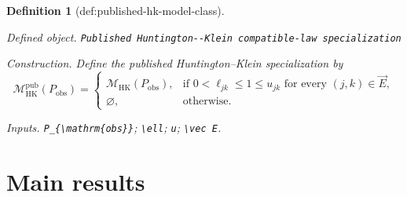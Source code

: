 \documentclass{article}
\newtheorem{definition}{Definition}
\begin{document}
\begin{definition}[def:published-hk-model-class]\label{def:published-hk-model-class}
\par\smallskip\noindent\emph{Defined object.} \texttt{Published Huntington-\allowbreak{}-\allowbreak{}Klein compatible-\allowbreak{}law specialization}
\par\smallskip\noindent\emph{Construction.} Define the published Huntington--Klein specialization by
\[
\mathcal M_{\mathrm{HK}}^{\mathrm{pub}}(P_{\mathrm{obs}})
=
\begin{cases}
\mathcal M_{\mathrm{HK}}(P_{\mathrm{obs}}),
&\text{if }0<\ell_{jk}\le 1\le u_{jk}\text{ for every }(j,k)\in\vec E,\\
\varnothing,&\text{otherwise}.
\end{cases}
\]
\par\smallskip\noindent\emph{Inputs.} \texttt{P\_\allowbreak{}\{\textbackslash{}\allowbreak{}mathrm\{obs\}\allowbreak{}\}\allowbreak{}}; \texttt{\textbackslash{}\allowbreak{}ell}; \texttt{u}; \texttt{\textbackslash{}\allowbreak{}vec E}.
\end{definition}

\section{Main results}
\end{document}
